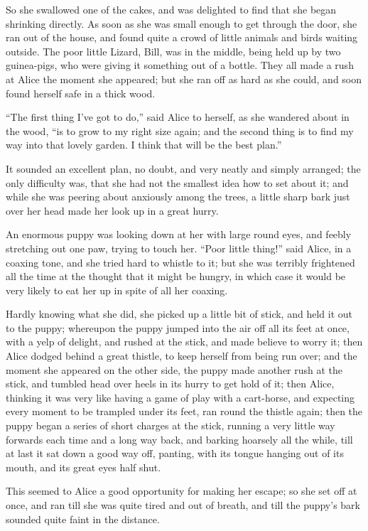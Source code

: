 \documentclass[11pt,openany,oneside]{book}
\begin{document}
So she swallowed one of the cakes, and was delighted to find that she began shrinking directly. As soon as she was small enough to get through the door, she ran out of the house, and found quite a crowd of little animals and birds waiting outside. The poor little Lizard, Bill, was in the middle, being held up by two guinea-pigs, who were giving it something out of a bottle. They all made a rush at Alice the moment she appeared; but she ran off as hard as she could, and soon found herself safe in a thick wood. 

“The first thing I’ve got to do,” said Alice to herself, as she wandered about in the wood, “is to grow to my right size again; and the second thing is to find my way into that lovely garden. I think that will be the best plan.” 

It sounded an excellent plan, no doubt, and very neatly and simply arranged; the only difficulty was, that she had not the smallest idea how to set about it; and while she was peering about anxiously among the trees, a little sharp bark just over her head made her look up in a great hurry. 

An enormous puppy was looking down at her with large round eyes, and feebly stretching out one paw, trying to touch her. “Poor little thing!” said Alice, in a coaxing tone, and she tried hard to whistle to it; but she was terribly frightened all the time at the thought that it might be hungry, in which case it would be very likely to eat her up in spite of all her coaxing. 

Hardly knowing what she did, she picked up a little bit of stick, and held it out to the puppy; whereupon the puppy jumped into the air off all its feet at once, with a yelp of delight, and rushed at the stick, and made believe to worry it; then Alice dodged behind a great thistle, to keep herself from being run over; and the moment she appeared on the other side, the puppy made another rush at the stick, and tumbled head over heels in its hurry to get hold of it; then Alice, thinking it was very like having a game of play with a cart-horse, and expecting every moment to be trampled under its feet, ran round the thistle again; then the puppy began a series of short charges at the stick, running a very little way forwards each time and a long way back, and barking hoarsely all the while, till at last it sat down a good way off, panting, with its tongue hanging out of its mouth, and its great eyes half shut. 

This seemed to Alice a good opportunity for making her escape; so she set off at once, and ran till she was quite tired and out of breath, and till the puppy’s bark sounded quite faint in the distance. 
\end{document}
